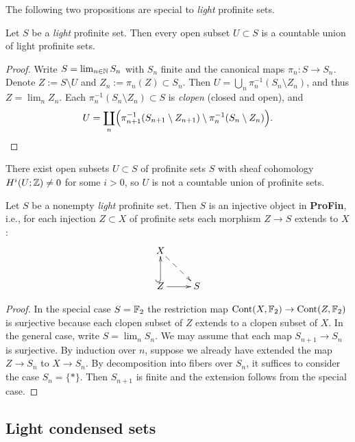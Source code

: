 \documentclass{notes}
\begin{document}
The following two propositions are special to {\em light} profinite
sets. 

\begin{prop}
Let $S$ be a {\em light} profinite set. Then every open subset $U\subset S$
is a countable union of light profinite sets. 
\end{prop}

\begin{proof}
Write $S=\lim_{n\in{\mathbb{N}}}S_n$ with $S_n$ finite and the canonical maps
$\pi_n:S\to S_n$. Denote $Z:=S\setminus U$ and $Z_n:=\pi_n(Z)\subset S_n$.
Then $U=\bigcup_n\pi_n^{-1}(S_n\setminus Z_n)$, and thus $Z=\lim_nZ_n$. 
Each $\pi_n^{-1}(S_n\setminus Z_n)\subset S$ is {\em clopen} (closed
and open), and
$$
  U = \coprod_n\Bigl(\pi_{n+1}^{-1}(S_{n+1}\setminus Z_{n+1})\setminus
  \pi_n^{-1}(S_n\setminus Z_n)\Bigr).
$$
\end{proof}

\begin{rem}
There exist open subsets $U\subset S$ of profinite sets $S$ with
sheaf cohomology $H^i(U;{\mathbb{Z}})\neq 0$ for some $i>0$, so $U$ is not 
a countable union of profinite sets.
\end{rem}

\begin{prop}
Let $S$ be a nonempty {\em light} profinite set. Then $S$ is an
injective object in {\bf ProFin}, i.e., for each injection $Z\subset
X$ of profinite sets each morphism $Z\to S$ extends to $X$: 
$$
\xymatrix{
  X \ar@{-->}[rd] \\ 
  Z \ar@{^{(}->}[u] \ar[r] & S
}
$$
\end{prop}

\begin{proof}
In the special case $S={\mathbb{F}}_2$ the restriction map
${\rm Cont}(X,{\mathbb{F}}_2)\to{\rm Cont}(Z,{\mathbb{F}}_2)$ is surjective because each clopen
subset of $Z$ extends to a clopen subset of $X$. 
In the general case, write $S=\lim_n S_n$. We may assume that each map
$S_{n+1}\to S_n$ is surjective. By induction over $n$, suppose we
already have extended the map $Z\to S_n$ to $X\to S_n$. By
decomposition into fibers over $S_n$, it suffices to consider the case
$S_n=\{*\}$. Then $S_{n+1}$ is finite and the extension follows
from the special case. 
\end{proof}

\subsection{Light condensed sets}
\end{document}

